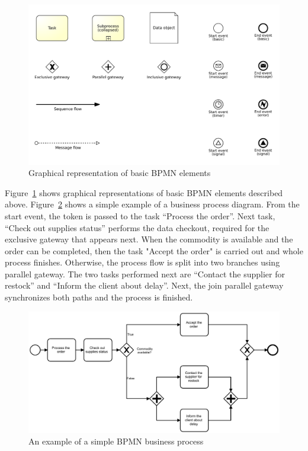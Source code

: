 \begin{figure}
\centering
\includegraphics[width=\textwidth]{./images/bpmn_core_elements.pdf}
\caption{Graphical representation of basic BPMN elements}
\label{fig:bpmn_core_elements}
\end{figure}
Figure~\ref{fig:bpmn_core_elements} shows graphical representations of basic BPMN elements described above. Figure~\ref{fig:process_example} shows a simple example of a business process diagram. From the start event, the token is passed to the task ``Process the order''. Next task, ``Check out supplies status'' performs the data checkout, required for the exclusive gateway that appears next. When the commodity is available and the order can be completed, then the task "Accept the order" is carried out and whole process finishes. Otherwise, the process flow is split into two branches using parallel gateway. The two tasks performed next are ``Contact the supplier for restock'' and ``Inform the client about delay''. Next, the join parallel gateway synchronizes both paths and the process is finished.

\begin{figure}
	\centering
	\includegraphics[width=\textwidth]{./images/process-example.pdf}
	\caption{An example of a simple BPMN business process}
	\label{fig:process_example}
\end{figure}

